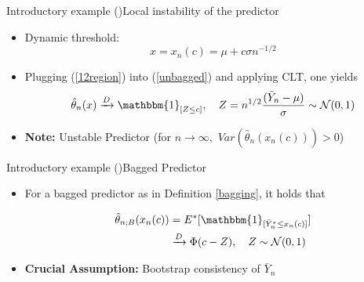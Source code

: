 \documentclass{beamer}
\begin{document}
\begin{frame}{Introductory example (\cite{Buhlmann2002})}{Local instability of the predictor} 
\begin{itemize}
\item Dynamic threshold:
\begin{equation}\label{12region}
 x = x_{n}(c)= \mu + c\sigma n^{-1/2}
\end{equation}



\item Plugging (\ref{12region}) into (\ref{unbagged}) and applying CLT, one yields
$$\hat{\theta}_{n}(x) \xrightarrow{D} \mathbbm{1}_{[Z \leq c]}, \quad Z= n^{1/2} \frac{(\bar{Y}_{n} - \mu )}{\sigma} \sim \mathcal{N}(0,1)$$

\item \textbf{Note:} Unstable Predictor (for $n \rightarrow \infty,$ $Var(\hat{\theta}_{n}(x_{n}(c))) > 0$)
\end{itemize}
\end{frame}

\begin{frame}{Introductory example (\cite{Buhlmann2002})}{Bagged Predictor}
\begin{itemize}
\item For a bagged predictor as in Definition \ref{bagging}, it holds that

\begin{equation}
\begin{split}
\hat{\theta}_{n;B}(x_{n}(c)) & =E^{*}[\mathbbm{1}_{[\bar{Y}_{n}^{*} \leq x_{n}(c)]}]\\
& \xrightarrow{D} \Phi(c-Z),\quad Z \sim \mathcal{N}(0,1)
\end{split}
\end{equation}

\item \textbf{Crucial Assumption:} Bootstrap consistency of $\bar{Y}_{n}$
\end{itemize}
\end{frame}
\end{document}

